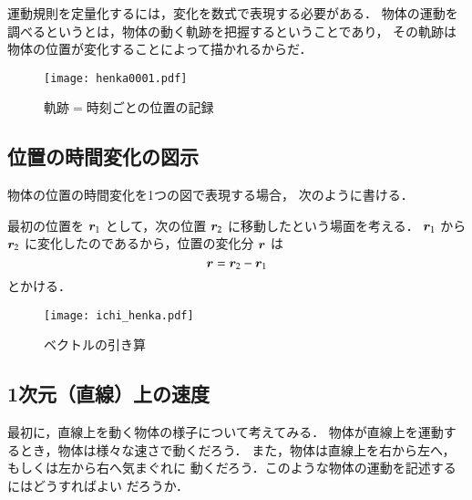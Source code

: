          運動規則を定量化するには，変化を数式で表現する必要がある．
         物体の運動を調べるというとは，物体の動く軌跡を把握するということであり，
         その軌跡は物体の位置が変化することによって描かれるからだ．
                    \begin{figure}[hbt]
                        \begin{center}
                            \texttt{[image: henka0001.pdf]}
                            \caption{軌跡$=$時刻ごとの位置の記録}
                            \label{fig:henka0001}
                        \end{center}
                    \end{figure}

        \subsection{位置の時間変化の図示}
        物体の位置の時間変化を1つの図で表現する場合，
        次のように書ける．

        最初の位置を $\boldsymbol{r}_{1}$ として，次の位置 $\boldsymbol{r}_{2}$ に移動したという場面を考える．
        $\boldsymbol{r}_{1}$ から $\boldsymbol{r}_{2}$ に変化したのであるから，位置の変化分 $\boldsymbol{r}$ は
        \[
            \boldsymbol{r} = \boldsymbol{r}_{2} - \boldsymbol{r}_{1}
        \]
        とかける．
        \begin{figure}[hbt]
            \begin{center}
                \texttt{[image: ichi\_henka.pdf]}
                \caption{ベクトルの引き算}
                \label{fig:ichi_henka}
                \end{center}
        \end{figure}


        \subsection{1次元（直線）上の速度}
                最初に，直線上を動く物体の様子について考えてみる．
                物体が直線上を運動するとき，物体は様々な速さで動くだろう．
                また，物体は直線上を右から左へ，もしくは左から右へ気まぐれに
                動くだろう．このような物体の運動を記述するにはどうすればよい
                だろうか．

